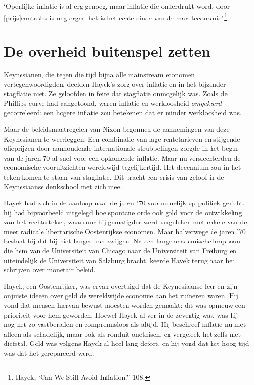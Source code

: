\documentclass[smalldemyvopaper,11pt,twoside,onecolumn,openright,extrafontsizes,hidelinks]{memoir}
\begin{document}
`Openlijke inflatie is al erg genoeg, maar inflatie die onderdrukt wordt
door {[}prijs{]}controles is nog erger: het is het echte einde van de
markteconomie'.\footnote{\hspace{0pt}Hayek, `Can We Still Avoid
  Inflation?' 108.}

\section{De overheid buitenspel
zetten}\label{de-overheid-buitenspel-zetten}

Keynesianen, die tegen die tijd bijna alle mainstream economen
vertegenwoordigden, deelden Hayek's zorg over inflatie en in het
bijzonder stagflatie niet. Ze geloofden in feite dat stagflatie
onmogelijk was. Zoals de Phillips-curve had aangetoond, waren inflatie
en werkloosheid \emph{omgekeerd} gecorreleerd: een hogere inflatie zou
betekenen dat er minder werkloosheid was.

Maar de beleidsmaatregelen van Nixon begonnen de aannemingen van deze
Keynesianen te weerleggen. Een combinatie van lage rentetarieven en
stijgende olieprijzen door aanhoudende internationale strubbelingen
zorgde in het begin van de jaren 70 al snel voor een opkomende inflatie.
Maar nu verslechterden de economische vooruitzichten wereldwijd
tegelijkertijd. Het decennium zou in het teken komen te staan van
stagflatie. Dit bracht een crisis van geloof in de Keynesiaanse
denkschool met zich mee.

Hayek had zich in de aanloop naar de jaren '70 voornamelijk op politiek
gericht: hij had bijvoorbeeld uitgelegd hoe spontane orde ook gold voor
de ontwikkeling van het rechtsstelsel, waardoor hij gematigder werd
vergeleken met enkele van de meer radicale libertarische Oostenrijkse
economen. Maar halverwege de jaren '70 besloot hij dat hij niet langer
kon zwijgen. Na een lange academische loopbaan die hem van de
Universiteit van Chicago naar de Universiteit van Freiburg en
uiteindelijk de Universiteit van Salzburg bracht, keerde Hayek terug
naar het schrijven over monetair beleid.

Hayek, een Oostenrijker, was ervan overtuigd dat de Keynesiaanse leer en
zijn onjuiste ideeën over geld de wereldwijde economie aan het ruïneren
waren. Hij vond dat mensen hiervan bewust moesten worden gemaakt: dit
was opnieuw een prioriteit voor hem geworden. Hoewel Hayek al ver in de
zeventig was, was hij nog net zo vastberaden en compromisloos als
altijd. Hij beschreef inflatie nu niet alleen als schadelijk, maar ook
als ronduit onethisch, en vergeleek het zelfs met diefstal. Geld was
volgens Hayek al heel lang defect, en hij vond dat het hoog tijd was dat
het gerepareerd werd.
\end{document}
